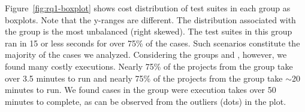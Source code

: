 Figure~\ref{fig:rq1-boxplot} shows cost distribution of test suites in
each group as boxplots.  Note that the y-ranges are different.  The
distribution associated with the \shortg{} group is the most
unbalanced (right skewed).  The test suites in this group ran in 15 or less seconds for
over 75\% of the cases.  Such scenarios constitute the majority of the
cases we analyzed.  Considering the groups \medg{} and \longg{},
however, we found many costly executions.  Nearly 75\% of the projects
from the \medg{} group take over 3.5 minutes to run and nearly 75\% of
the projects from the \longg{} group take $\sim$20 minutes to run.  We
found cases in the \longg{} group were execution takes over 50 minutes
to complete, as can be observed from the outliers (dots) in the plot.


